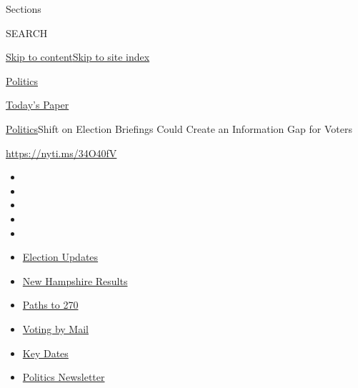 Sections

SEARCH

\protect\hyperlink{site-content}{Skip to
content}\protect\hyperlink{site-index}{Skip to site index}

\href{https://www.nytimes3xbfgragh.onion/section/politics}{Politics}

\href{https://myaccount.nytimes3xbfgragh.onion/auth/login?response_type=cookie\&client_id=vi}{}

\href{https://www.nytimes3xbfgragh.onion/section/todayspaper}{Today's
Paper}

\href{/section/politics}{Politics}\textbar{}Shift on Election Briefings
Could Create an Information Gap for Voters

\url{https://nyti.ms/34O40fV}

\begin{itemize}
\item
\item
\item
\item
\item
\end{itemize}

\begin{itemize}
\item
  \href{https://www.nytimes3xbfgragh.onion/live/2020/09/09/us/trump-vs-biden?action=click\&pgtype=Article\&state=default\&region=TOP_BANNER\&context=storylines_menu}{Election
  Updates}
\item
  \href{https://www.nytimes3xbfgragh.onion/interactive/2020/09/08/us/elections/results-new-hampshire-primary-elections.html?action=click\&pgtype=Article\&state=default\&region=TOP_BANNER\&context=storylines_menu}{New
  Hampshire Results}
\item
  \href{https://www.nytimes3xbfgragh.onion/interactive/2020/us/elections/election-states-biden-trump.html?action=click\&pgtype=Article\&state=default\&region=TOP_BANNER\&context=storylines_menu}{Paths
  to 270}
\item
  \href{https://www.nytimes3xbfgragh.onion/interactive/2020/08/31/us/politics/vote-by-mail-deadlines.html?action=click\&pgtype=Article\&state=default\&region=TOP_BANNER\&context=storylines_menu}{Voting
  by Mail}
\item
  \href{https://www.nytimes3xbfgragh.onion/interactive/2019/us/elections/2020-presidential-election-calendar.html?action=click\&pgtype=Article\&state=default\&region=TOP_BANNER\&context=storylines_menu}{Key
  Dates}
\item
  \href{https://www.nytimes3xbfgragh.onion/newsletters/politics?action=click\&pgtype=Article\&state=default\&region=TOP_BANNER\&context=storylines_menu}{Politics
  Newsletter}
\end{itemize}

